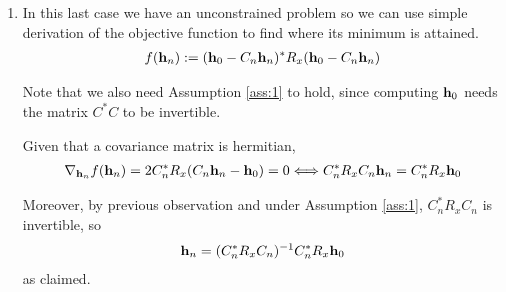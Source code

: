\documentclass{article}
\begin{document}
\begin{enumerate}[label=(\roman*)]
        \item In this last case we have an unconstrained problem so we can use simple derivation of the objective function to find where its minimum is attained.
        \begin{align}
            f(\mathbf{h}_n) := (\mathbf{h}_0 - C_n \mathbf{h}_n )^* R_x (\mathbf{h}_0 - C_n \mathbf{h}_n )
        \end{align}
        
        Note that we also need Assumption \ref{ass:1} to hold, since computing $\mathbf{h}_0$ needs the matrix $C^* C$ to be invertible.
        
        Given that a covariance matrix is hermitian,
        \begin{align}
            \nabla_{\mathbf{h}_n} f(\mathbf{h}_n) = 2 C_n^* R_x (C_n \mathbf{h}_n - \mathbf{h}_0) = 0 \Longleftrightarrow C_n^* R_x C_n \mathbf{h}_n =  C_n^* R_x \mathbf{h}_0
        \end{align}
        
        Moreover, by previous observation and under Assumption \ref{ass:1}, $C_n^* R_x C_n$ is invertible, so
        \begin{align}
            \mathbf{h}_n = (C_n^* R_x C_n)^{-1} C_n^* R_x \mathbf{h}_0
        \end{align}
        as claimed.
    \end{enumerate}
\end{document}
